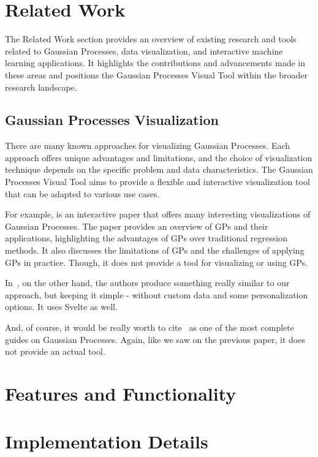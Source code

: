 \documentclass[preprint,journal]{vgtc}       %
\begin{document}
\section{Related Work}

The Related Work section provides an overview of existing research and tools related to Gaussian Processes, data visualization, and interactive machine learning applications. It highlights the contributions and advancements made in these areas and positions the Gaussian Processes Visual Tool within the broader research landscape.

\subsection{Gaussian Processes Visualization}

There are many known approaches for visualizing Gaussian Processes. Each approach offers unique advantages and limitations, and the choice of visualization technique depends on the specific problem and data characteristics. The Gaussian Processes Visual Tool aims to provide a flexible and interactive visualization tool that can be adapted to various use cases.

For example, \cite{gortler2019a} is an interactive paper that offers many interesting visualizations of Gaussian Processes. The paper provides an overview of GPs and their applications, highlighting the advantages of GPs over traditional regression methods. It also discusses the limitations of GPs and the challenges of applying GPs in practice. Though, it does not provide a tool for visualizing or using GPs.

In~\cite{smlbook}, on the other hand, the authors produce something really similar to our approach, but keeping it simple - without custom data and some personalization options. It uses Svelte as well.

And, of course, it would be really worth to cite~\cite{gpguide} as one of the most complete guides on Gaussian Processes. Again, like we saw on the previous paper, it does not provide an actual tool.

\section{Features and Functionality}

\section{Implementation Details}
\end{document}
